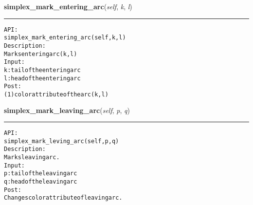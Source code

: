    \label{coinor:gimpy:graph:Graph:simplex_mark_entering_arc}

    \vspace{0.5ex}

\hspace{.8\funcindent}\begin{boxedminipage}{\funcwidth}

    \raggedright \textbf{simplex\_mark\_entering\_arc}(\textit{self}, \textit{k}, \textit{l})

    \vspace{-1.5ex}

    \rule{\textwidth}{0.5\fboxrule}
\setlength{\parskip}{2ex}
\begin{alltt}

API:
    simplex\_mark\_entering\_arc(self, k, l)
Description:
    Marks entering arc (k,l)
Input:
    k: tail of the entering arc
    l: head of the entering arc
Post:
    (1) color attribute of the arc (k,l)
\end{alltt}

\setlength{\parskip}{1ex}
    \end{boxedminipage}

    \label{coinor:gimpy:graph:Graph:simplex_mark_leaving_arc}

    \vspace{0.5ex}

\hspace{.8\funcindent}\begin{boxedminipage}{\funcwidth}

    \raggedright \textbf{simplex\_mark\_leaving\_arc}(\textit{self}, \textit{p}, \textit{q})

    \vspace{-1.5ex}

    \rule{\textwidth}{0.5\fboxrule}
\setlength{\parskip}{2ex}
\begin{alltt}

API:
    simplex\_mark\_leving\_arc(self, p, q)
Description:
    Marks leaving arc.
Input:
    p: tail of the leaving arc
    q: head of the leaving arc
Post:
    Changes color attribute of leaving arc.
\end{alltt}

\setlength{\parskip}{1ex}
    \end{boxedminipage}

